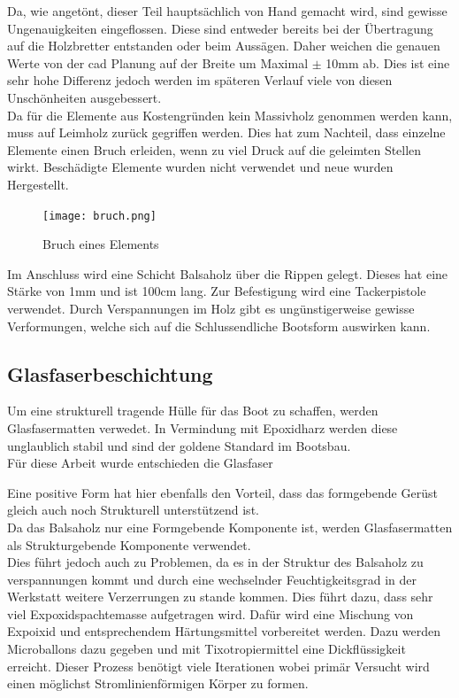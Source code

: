 Da, wie angetönt, dieser Teil hauptsächlich von Hand gemacht wird, sind gewisse Ungenauigkeiten eingeflossen. Diese sind entweder bereits bei der Übertragung auf die Holzbretter entstanden oder beim Aussägen. Daher weichen die genauen Werte von der \ac{cad} Planung auf der Breite um Maximal $\pm$ 10mm ab. Dies ist eine sehr hohe Differenz jedoch werden im späteren Verlauf viele von diesen Unschönheiten ausgebessert. \\ 
Da für die Elemente aus Kostengründen kein Massivholz genommen werden kann, muss auf Leimholz zurück gegriffen werden. Dies hat zum Nachteil, dass einzelne Elemente einen Bruch erleiden, wenn zu viel Druck auf die geleimten Stellen wirkt. Beschädigte Elemente wurden nicht verwendet und neue wurden Hergestellt. 
\begin{figure}[H]
    \centering
    \texttt{[image: bruch.png]}
    \caption{Bruch eines Elements}
    \label{fig:bruch}
\end{figure}

Im Anschluss wird eine Schicht Balsaholz über die Rippen gelegt. Dieses hat eine Stärke von 1mm und ist 100cm lang. Zur Befestigung wird eine Tackerpistole verwendet. Durch Verspannungen im Holz gibt es ungünstigerweise gewisse Verformungen, welche sich auf die Schlussendliche Bootsform auswirken kann.


\subsection{Glasfaserbeschichtung}
Um eine strukturell tragende Hülle für das Boot zu schaffen, werden Glasfasermatten verwedet. In Vermindung mit Epoxidharz werden diese unglaublich stabil und sind der goldene Standard im Bootsbau. \\
Für diese Arbeit wurde entschieden die Glasfaser

Eine positive Form hat hier ebenfalls den Vorteil, dass das formgebende Gerüst gleich auch noch Strukturell unterstützend ist. \\
Da das Balsaholz nur eine Formgebende Komponente ist, werden Glasfasermatten als Strukturgebende Komponente verwendet. \\
Dies führt jedoch auch zu Problemen, da es in der Struktur des Balsaholz zu verspannungen kommt und durch eine wechselnder Feuchtigkeitsgrad in der Werkstatt weitere Verzerrungen zu stande kommen. Dies führt dazu, dass sehr viel Expoxidspachtemasse aufgetragen wird. Dafür wird eine Mischung von Expoixid und entsprechendem Härtungsmittel vorbereitet werden. Dazu werden Microballons dazu gegeben und mit Tixotropiermittel eine Dickflüssigkeit erreicht. Dieser Prozess benötigt viele Iterationen wobei primär Versucht wird einen möglichst Stromlinienförmigen Körper zu formen.

